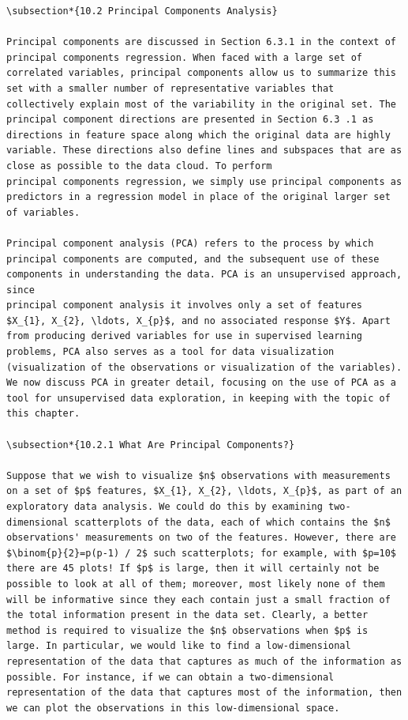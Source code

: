 \documentclass[10pt]{article}
\begin{document}
\begin{verbatim}
\subsection*{10.2 Principal Components Analysis}

Principal components are discussed in Section 6.3.1 in the context of principal components regression. When faced with a large set of correlated variables, principal components allow us to summarize this set with a smaller number of representative variables that collectively explain most of the variability in the original set. The principal component directions are presented in Section 6.3 .1 as directions in feature space along which the original data are highly variable. These directions also define lines and subspaces that are as close as possible to the data cloud. To perform
principal components regression, we simply use principal components as predictors in a regression model in place of the original larger set of variables.

Principal component analysis (PCA) refers to the process by which principal components are computed, and the subsequent use of these components in understanding the data. PCA is an unsupervised approach, since
principal component analysis it involves only a set of features $X_{1}, X_{2}, \ldots, X_{p}$, and no associated response $Y$. Apart from producing derived variables for use in supervised learning problems, PCA also serves as a tool for data visualization (visualization of the observations or visualization of the variables). We now discuss PCA in greater detail, focusing on the use of PCA as a tool for unsupervised data exploration, in keeping with the topic of this chapter.

\subsection*{10.2.1 What Are Principal Components?}

Suppose that we wish to visualize $n$ observations with measurements on a set of $p$ features, $X_{1}, X_{2}, \ldots, X_{p}$, as part of an exploratory data analysis. We could do this by examining two-dimensional scatterplots of the data, each of which contains the $n$ observations' measurements on two of the features. However, there are $\binom{p}{2}=p(p-1) / 2$ such scatterplots; for example, with $p=10$ there are 45 plots! If $p$ is large, then it will certainly not be possible to look at all of them; moreover, most likely none of them will be informative since they each contain just a small fraction of the total information present in the data set. Clearly, a better method is required to visualize the $n$ observations when $p$ is large. In particular, we would like to find a low-dimensional representation of the data that captures as much of the information as possible. For instance, if we can obtain a two-dimensional representation of the data that captures most of the information, then we can plot the observations in this low-dimensional space.


\end{verbatim}
\end{document}
